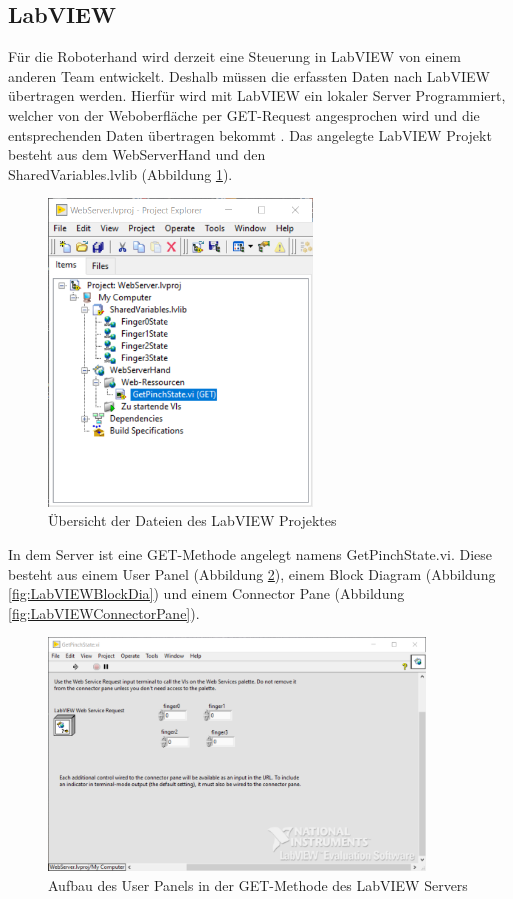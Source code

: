 \documentclass[a4paper,12pt,final]{article} %
\numberwithin{equation}{section} %
\numberwithin{figure}{section} %
\numberwithin{table}{section} %
\begin{document}
\subsection{LabVIEW}
Für die Roboterhand wird derzeit eine Steuerung in LabVIEW von einem anderen Team entwickelt. 
Deshalb müssen die erfassten Daten nach LabVIEW übertragen werden. Hierfür wird mit LabVIEW ein lokaler Server Programmiert, welcher von der Web\-ober\-fläche per GET-Request angesprochen wird und die entsprechenden Daten übertragen bekommt \cite{NIwebserverTutorial}.
Das angelegte LabVIEW Projekt besteht aus dem WebServerHand und den \\SharedVariables.lvlib (Abbildung \ref{fig:ProjektExplorer}).
\begin{figure}[H]
	\begin{center}
		\includegraphics[width=7cm]{Bilder/ProjektExplorer.png}
		\caption{Übersicht der Dateien des LabVIEW Projektes}
		\label{fig:ProjektExplorer}
	\end{center}
\end{figure}
In dem Server ist eine GET-Methode angelegt namens GetPinchState.vi. Diese besteht aus einem User Panel (Abbildung \ref{fig:LabVIEWuserPanel}), einem Block Diagram (Abbildung \ref{fig:LabVIEWBlockDia}) und einem Connector Pane (Abbildung \ref{fig:LabVIEWConnectorPane}).
\begin{figure}[H]
	\begin{center}
		\includegraphics[width=10cm]{Bilder/UserPanel.png}
		\caption{Aufbau des User Panels in der GET-Methode des LabVIEW Servers}
		\label{fig:LabVIEWuserPanel}
	\end{center}
\end{figure}  
\end{document}
